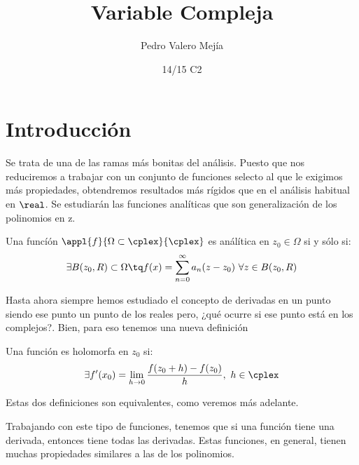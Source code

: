 \documentclass{apuntes}
\title{Variable Compleja}
\author{Pedro Valero Mejía}
\date{14/15 C2}
\begin{document}
\pagestyle{plain}
\maketitle

\tableofcontents
\newpage
\chapter{Introducción}
Se trata de una de las ramas más bonitas del análisis. Puesto que nos reduciremos a trabajar con un conjunto de funciones selecto al que le exigimos más propiedades, obtendremos resultados más rígidos que en el análisis habitual en $\real$. Se estudiarán las funciones analíticas que son generalización de los polinomios en z.

\begin{defn}
Una funcíón $\appl{f}{\Omega \subset \cplex}{\cplex}$ es análítica en $z_0\in\Omega$ si y sólo si:
\[\exists B(z_0,R)\subset \Omega \tq f(x)=\sum_{n=0}^{\infty}a_n(z-z_0) \ \forall z \in B(z_0, R)\]
\end{defn}

Hasta ahora siempre hemos estudiado el concepto de derivadas en un punto siendo ese punto un punto de los reales pero, ¿qué ocurre si ese punto está en los complejos?. Bien, para eso tenemos una nueva definición

\begin{defn}
Una función es holomorfa en $z_0$ si:
\[\exists f'(x_0)=\lim_{h \to 0}\frac{f(z_0+h)-f(z_0)}{h}, \ h \in \cplex\]
\end{defn}

Estas dos definiciones son equivalentes, como veremos más adelante.

Trabajando con este tipo de funciones, tenemos que si una función tiene una derivada, entonces tiene todas las derivadas. Estas funciones, en general, tienen muchas propiedades similares a las de los polinomios.
\end{document}
